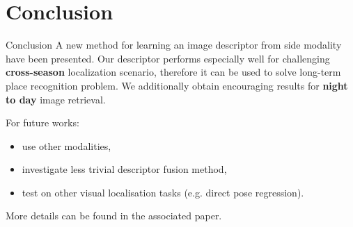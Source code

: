 \section{Conclusion}

\label{sec:conclusion}

\begin{frame}{Conclusion}
	A new method for learning an image descriptor from side modality have been presented. Our descriptor performs especially well for challenging \textbf{cross-season} localization scenario, therefore it can be used to solve long-term place recognition problem. We additionally obtain encouraging results for \textbf{night to day} image retrieval.
	\vfill
	\uncover<2->
	{
	For future works:
	\begin{itemize}
		\item use other modalities,
		\item investigate less trivial descriptor fusion method,
		\item test on other visual localisation tasks (e.g. direct pose regression).
	\end{itemize}
	}
	{
	\vfill	
	More details can be found in the associated paper.
	}	
\end{frame}

